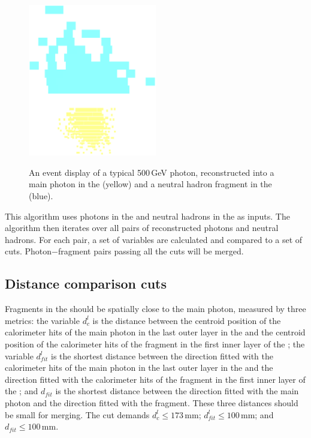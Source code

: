 \begin{figure}[tbph]
\centering
{\includegraphics[width=0.5\textwidth]{photon/hcalfrag}}%
\caption{An event display of a typical 500\,GeV photon, reconstructed into a main photon in the \ECAL (yellow) and a neutral hadron fragment in the \HCAL (blue).}
\label{fig:photonEvtDspHCalFrag}
\end{figure}

This algorithm uses photons in the \ECAL and neutral hadrons in the \HCAL as inputs. The algorithm then iterates over all pairs of reconstructed photons and neutral hadrons. For each pair, a set of variables are calculated and compared to a set of cuts. Photon$-$fragment pairs passing all the cuts will be merged.

\subsection{Distance comparison cuts}

Fragments in the \HCAL should be spatially close to the main photon, measured by three metrics: the variable $d^l_c$ is the distance between the centroid position of the calorimeter hits of the main photon in the last outer layer in the \ECAL and the centroid position of the calorimeter hits of the fragment in the first inner layer of the \HCAL; the variable $d^l_{fit}$ is the shortest distance between the direction fitted with the calorimeter hits of the main photon in the  last outer layer in the \ECAL and the direction fitted with  the calorimeter hits of the fragment in the first inner layer of the \HCAL; and $d_{fit}$ is the shortest distance between the direction fitted with the main photon and the direction fitted with the fragment. These three distances should be small for merging. The cut demands $d^l_c \leqslant 173\,\text{mm}$; $d^l_{fit} \leqslant 100\,\text{mm}$; and $d_{fit} \leqslant 100\,\text{mm}$.

